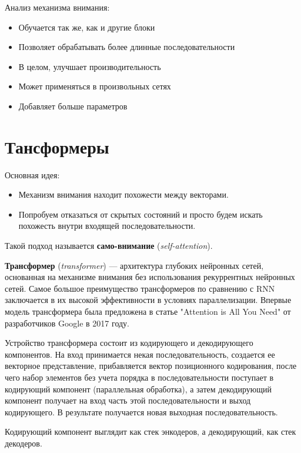Анализ механизма внимания:
\begin{itemize}
    \item Обучается так же, как и другие блоки
    \item Позволяет обрабатывать более длинные последовательности
    \item В целом, улучшает производительность
    \item Может применяться в произвольных сетях
    \item Добавляет больше параметров
\end{itemize}

\section{Тансформеры}

Основная идея:
\begin{itemize}
    \item Механизм внимания находит похожести между векторами.
    \item Попробуем отказаться от скрытых состояний и просто будем искать похожесть внутри входящей последовательности.
\end{itemize}

Такой подход называется \textbf{само-внимание} (\textit{self-attention}).

\begin{definition}
    \textbf{Трансформер} (\textit{transformer}) — архитектура глубоких нейронных сетей, основанная на механизме внимания без использования рекуррентных нейронных сетей. Самое большое преимущество трансформеров по сравнению с RNN заключается в их высокой эффективности в условиях параллелизации. Впервые модель трансформера была предложена в статье "Attention is All You Need" от разработчиков Google в 2017 году.
\end{definition}

Устройство трансформера состоит из кодирующего и декодирующего компонентов. На вход принимается некая последовательность, создается ее векторное представление, прибавляется вектор позиционного кодирования, после чего набор элементов без учета порядка в последовательности поступает в кодирующий компонент (параллельная обработка), а затем декодирующий компонент получает на вход часть этой последовательности и выход кодирующего. В результате получается новая выходная последовательность.

\begin{remark}
    Кодирующий компонент выглядит как стек энкодеров, а декодирующий, как стек декодеров.
\end{remark}

